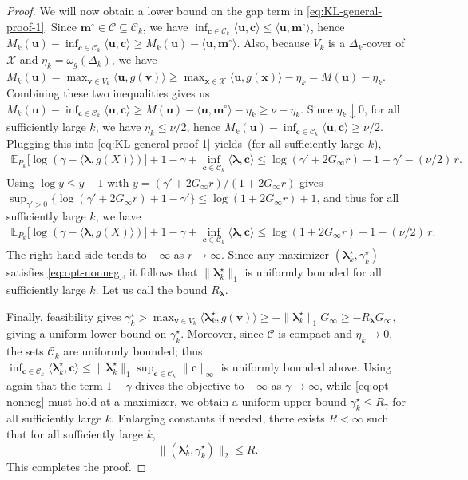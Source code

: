 \documentclass{article}
\theoremstyle{plain}
\theoremstyle{definition}
\newcommand{\calC}{\mathcal C}
\newcommand{\calX}{\mathcal X}
\newcommand{\cvec}{\mathbf{c}}
\newcommand{\mvec}{\mathbf{m}}
\newcommand{\uvec}{\mathbf{u}}
\newcommand{\vvec}{\mathbf{v}}
\newcommand{\xvec}{\mathbf{x}}
\newcommand{\boldlambda}{\boldsymbol{\lambda}}
\begin{document}
\begin{proof}
We will now obtain a lower bound on the gap term in \eqref{eq:KL-general-proof-1}. Since $\mvec^{\circ}\in\calC\subseteq \calC_k$, we have $\inf_{\cvec\in\calC_k}\langle \uvec,\cvec\rangle\le \langle \uvec,\mvec^{\circ}\rangle$, hence
$ M_k(\uvec)-\inf_{\cvec\in\calC_k}\langle \uvec,\cvec\rangle \ge M_k(\uvec)-\langle \uvec,\mvec^{\circ}\rangle$. 
Also, because $V_k$ is a $\Delta_k$-cover of $\calX$ and $\eta_k=\omega_g(\Delta_k)$, we have
$ M_k(\uvec)=\max_{\vvec\in V_k}\langle \uvec,g(\vvec)\rangle
\ge \max_{\xvec\in\calX}\langle \uvec,g(\xvec)\rangle-\eta_k
= M(\uvec)-\eta_k$. 
Combining these two inequalities gives us  $M_k(\uvec)-\inf_{\cvec\in\calC_k}\langle \uvec,\cvec\rangle \ge M(\uvec)-\langle \uvec,\mvec^{\circ}\rangle-\eta_k \ge \nu-\eta_k$. Since $\eta_k \downarrow 0$, for all sufficiently large $k$, we have $\eta_k\le \nu/2$, hence $M_k(\uvec)-\inf_{\cvec\in\calC_k}\langle \uvec,\cvec\rangle\ge \nu/2$. Plugging this into \eqref{eq:KL-general-proof-1} yields~(for all sufficiently large $k$),
\begin{align}
\mathbb E_{P_k}\!\big[\log(\gamma-\langle \boldlambda,g(X)\rangle)\big] + 1-\gamma + \inf_{\cvec\in\calC_k}\langle \boldlambda,\cvec\rangle \le \log(\gamma'+2G_\infty r) + 1-\gamma' - (\nu/2)\,r.
\end{align}
Using $\log y\le y-1$ with $y=(\gamma'+2G_\infty r)/(1+2G_\infty r)$ gives
$ \sup_{\gamma'>0}\{\log(\gamma'+2G_\infty r)+1-\gamma'\}\le \log(1+2G_\infty r)+1$, 
and thus for all sufficiently large $k$, we have
\begin{align}
\mathbb E_{P_k}\!\big[\log(\gamma-\langle \boldlambda,g(X)\rangle)\big] + 1-\gamma + \inf_{\cvec\in\calC_k}\langle \boldlambda,\cvec\rangle
\le \log(1+2G_\infty r)+1-(\nu/2)\,r.
\end{align}
The right-hand side tends to $-\infty$ as $r\to\infty$. Since any maximizer $(\boldlambda_k^\star,\gamma_k^\star)$ satisfies \eqref{eq:opt-nonneg}, it follows that $\|\boldlambda_k^\star\|_1$ is uniformly bounded for all sufficiently large $k$. Let us call the bound $R_{\boldlambda}$.

Finally, feasibility gives $\gamma_k^\star>\max_{\vvec\in V_k}\langle \boldlambda_k^\star,g(\vvec)\rangle\ge
-\|\boldlambda_k^\star\|_1 G_\infty\ge -R_{\boldlambda}G_\infty$, giving a uniform lower bound on $\gamma_k^\star$.
Moreover, since $\calC$ is compact and $\eta_k\to 0$, the sets $\calC_k$ are uniformly bounded; thus
$\inf_{\cvec\in\calC_k}\langle \boldlambda_k^\star,\cvec\rangle\le \|\boldlambda_k^\star\|_1\sup_{\cvec\in\calC_k}\|\cvec\|_\infty$
is uniformly bounded above. Using again that the term $1-\gamma$ drives the objective to $-\infty$ as $\gamma\to\infty$,
while \eqref{eq:opt-nonneg} must hold at a maximizer, we obtain a uniform upper bound $\gamma_k^\star\le R_\gamma$ for all sufficiently
large $k$. Enlarging constants if needed, there exists $R<\infty$ such that for all sufficiently large $k$,
\[
\|(\boldlambda_k^\star,\gamma_k^\star)\|_2\le R. \label{eq:theta-star-bound}
\]
This completes the proof.
\end{proof}
\end{document}
